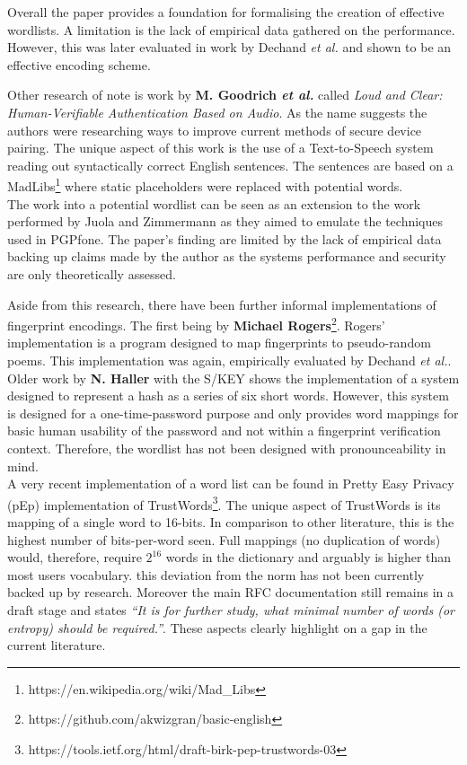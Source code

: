 Overall the paper provides a foundation for formalising the creation of effective wordlists. A limitation is the lack of empirical data gathered on the performance. However, this was later evaluated in work by Dechand \textit{et al.} \cite{dechand2016empirical} and shown to be an effective encoding scheme.

Other research of note is work by \textbf{M. Goodrich \textit{et al.}}\cite{goodrich2006loud} called \textit{Loud and Clear: Human-Verifiable Authentication Based on Audio}. As the name suggests the authors were researching ways to improve current methods of secure device pairing. The unique aspect of this work is the use of a Text-to-Speech system reading out syntactically correct English sentences. The sentences are based on a MadLibs\footnote{https://en.wikipedia.org/wiki/Mad\_Libs} where static placeholders were replaced with potential words.\\
The work into a potential wordlist can be seen as an extension to the work performed by Juola and Zimmermann\cite{juola1996whole} as they aimed to emulate the techniques used in PGPfone. The paper's finding are limited by the lack of empirical data backing up claims made by the author as the systems performance and security are only theoretically assessed.

Aside from this research, there have been further informal implementations of fingerprint encodings. The first being by \textbf{Michael Rogers}\footnote{https://github.com/akwizgran/basic-english}. Rogers' implementation is a program designed to map fingerprints to pseudo-random poems. This implementation was again, empirically evaluated by Dechand \textit{et al.}\cite{dechand2016empirical}. Older work by \textbf{N. Haller} with the S/KEY\cite{haller1995s} shows the implementation of a system designed to represent a hash as a series of six short words. However, this system is designed for a one-time-password purpose and only provides word mappings for basic human usability of the password and not within a fingerprint verification context. Therefore, the wordlist has not been designed with pronounceability in mind.
\\
A very recent implementation of a word list can be found in Pretty Easy Privacy (pEp) implementation of TrustWords\footnote{https://tools.ietf.org/html/draft-birk-pep-trustwords-03}. The unique aspect of TrustWords is its mapping of a single word to 16-bits. In comparison to other literature, this is the highest number of bits-per-word seen. Full mappings (no duplication of words) would, therefore, require $2^{16}$ words in the dictionary and arguably is higher than most users vocabulary. this deviation from the norm has not been currently backed up by research. Moreover the main RFC documentation still remains in a draft stage and states \textit{``It is for further study, what minimal number of words (or entropy) should be required.''}. These aspects clearly highlight on a gap in the current literature.

